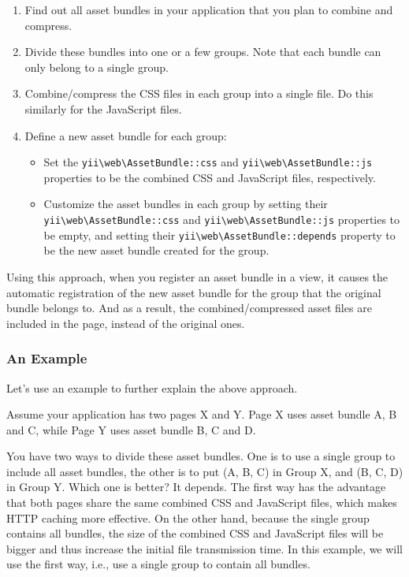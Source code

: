 \begin{enumerate}
\item Find out all asset bundles in your application that you plan to combine and compress.
\item Divide these bundles into one or a few groups. Note that each bundle can only belong to a single group.
\item Combine/compress the CSS files in each group into a single file. Do this similarly for the JavaScript files.
\item Define a new asset bundle for each group:\begin{itemize}
\item Set the \texttt{yii{\allowbreak{}\textbackslash}web{\allowbreak{}\textbackslash}AssetBundle\allowbreak{}::\allowbreak{}css} and \texttt{yii{\allowbreak{}\textbackslash}web{\allowbreak{}\textbackslash}AssetBundle\allowbreak{}::\allowbreak{}js} properties to be
the combined CSS and JavaScript files, respectively.
\item Customize the asset bundles in each group by setting their \texttt{yii{\allowbreak{}\textbackslash}web{\allowbreak{}\textbackslash}AssetBundle\allowbreak{}::\allowbreak{}css} and 
\texttt{yii{\allowbreak{}\textbackslash}web{\allowbreak{}\textbackslash}AssetBundle\allowbreak{}::\allowbreak{}js} properties to be empty, and setting their \texttt{yii{\allowbreak{}\textbackslash}web{\allowbreak{}\textbackslash}AssetBundle\allowbreak{}::\allowbreak{}depends}
property to be the new asset bundle created for the group.
\end{itemize}

\end{enumerate}
Using this approach, when you register an asset bundle in a view, it causes the automatic registration of
the new asset bundle for the group that the original bundle belongs to. And as a result, the combined/compressed 
asset files are included in the page, instead of the original ones.

\subsubsection{An Example \label{structure-assets.md::example}}
Let's use an example to further explain the above approach. 

Assume your application has two pages X and Y. Page X uses asset bundle A, B and C, while Page Y uses asset bundle B, C and D. 

You have two ways to divide these asset bundles. One is to use a single group to include all asset bundles, the
other is to put (A, B, C) in Group X, and (B, C, D) in Group Y. Which one is better? It depends. The first way
has the advantage that both pages share the same combined CSS and JavaScript files, which makes HTTP caching
more effective. On the other hand, because the single group contains all bundles, the size of the combined CSS and 
JavaScript files will be bigger and thus increase the initial file transmission time. In this example, we will use 
the first way, i.e., use a single group to contain all bundles.

